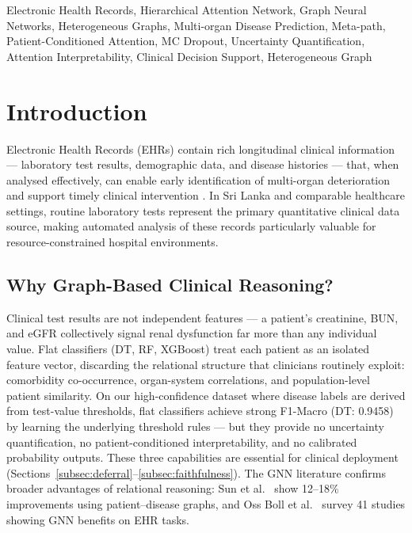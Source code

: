 \documentclass[conference]{IEEEtran}
\begin{document}
\begin{IEEEkeywords}
Electronic Health Records, Hierarchical Attention Network, Graph Neural
Networks, Heterogeneous Graphs, Multi-organ Disease Prediction, Meta-path,
Patient-Conditioned Attention, MC Dropout, Uncertainty Quantification,
Attention Interpretability, Clinical Decision Support, Heterogeneous Graph
\end{IEEEkeywords}

\section{Introduction}
\label{sec:intro}

Electronic Health Records (EHRs) contain rich longitudinal clinical
information --- laboratory test results, demographic data, and disease
histories --- that, when analysed effectively, can enable early
identification of multi-organ deterioration and support timely clinical
intervention \cite{obermeyer_2016, rajpurkar_2022}.
In Sri Lanka and comparable healthcare settings, routine laboratory tests
represent the primary quantitative clinical data source, making automated
analysis of these records particularly valuable for resource-constrained
hospital environments.

\subsection{Why Graph-Based Clinical Reasoning?}
\label{subsec:motivation}

Clinical test results are not independent features --- a patient's creatinine,
BUN, and eGFR collectively signal renal dysfunction far more than any individual
value.
Flat classifiers (DT, RF, XGBoost) treat each patient as an isolated feature
vector, discarding the relational structure that clinicians routinely exploit:
comorbidity co-occurrence, organ-system correlations, and population-level
patient similarity.
On our high-confidence dataset where disease labels are derived from
test-value thresholds, flat classifiers achieve strong F1-Macro (DT: 0.9458)
by learning the underlying threshold rules --- but they provide no uncertainty
quantification, no patient-conditioned interpretability, and no calibrated
probability outputs.
These three capabilities are essential for clinical deployment
(Sections~\ref{subsec:deferral}--\ref{subsec:faithfulness}).
The GNN literature confirms broader advantages of relational reasoning:
Sun et al.\ \cite{sun_2021} show 12--18\% improvements using
patient--disease graphs, and Oss Boll et al.\ \cite{oss_boll_2024}
survey 41 studies showing GNN benefits on EHR tasks.
\end{document}
